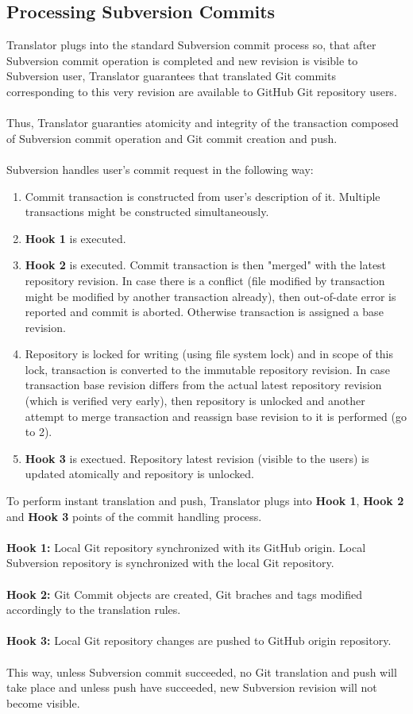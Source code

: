 \subsection{Processing Subversion Commits}

Translator plugs into the standard Subversion commit process so, that after Subversion commit operation
is completed and new revision is visible to Subversion user, Translator guarantees that translated Git commits
corresponding to this very revision are available to GitHub Git repository users.
\\\\
Thus, Translator guaranties atomicity and integrity of the transaction composed of Subversion commit operation
and Git commit creation and push.
\\\\
Subversion handles user's commit request in the following way:

\begin{enumerate}
\compactlist
\item Commit transaction is constructed from user's description of it. Multiple transactions might be constructed simultaneously.
\item \textbf{Hook 1} is executed.
\item \textbf{Hook 2} is executed. Commit transaction is then "merged" with the latest repository revision. In case there is a conflict (file modified by transaction might be modified by another transaction already), then out-of-date error is reported and commit is aborted. Otherwise transaction is assigned a base revision.
\item Repository is locked for writing (using file system lock) and in scope of this lock, transaction is converted to the immutable repository revision. In case transaction base revision differs from the actual latest repository revision (which is verified very early), then repository is unlocked and another attempt to merge transaction and reassign base revision to it is performed (go to 2).
\item \textbf{Hook 3} is exectued. Repository latest revision (visible to the users) is updated atomically and repository is unlocked.
\end{enumerate}
To perform instant translation and push, Translator plugs into \textbf{Hook 1}, \textbf{Hook 2} and \textbf{Hook 3} points of the commit handling process.
\\\\
\textbf{Hook 1:} Local Git repository synchronized with its GitHub origin. Local Subversion repository is synchronized with the local Git repository.
\\\\
\textbf{Hook 2:} Git Commit objects are created, Git braches and tags modified accordingly to the translation rules.
\\\\
\textbf{Hook 3:} Local Git repository changes are pushed to GitHub origin repository.
\\\\
This way, unless Subversion commit succeeded, no Git translation and push will take place and unless push have succeeded, new Subversion revision will not become visible.
